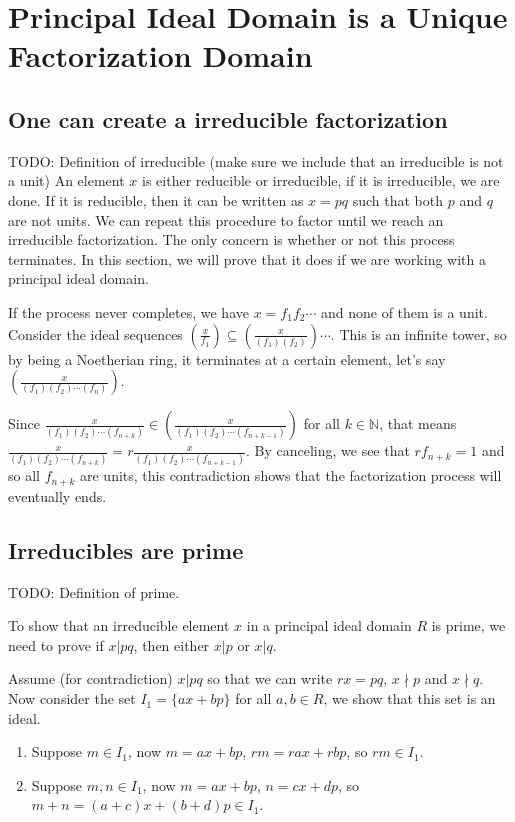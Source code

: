 \documentclass{article}
\begin{document}
\section*{Principal Ideal Domain is a Unique Factorization Domain}
\subsection*{One can create a irreducible factorization}
TODO: Definition of irreducible (make sure we include that an irreducible is not a unit)
An element $ x $ is either reducible or irreducible, if it is irreducible, we are done. If it is reducible, then it can be written as $ x = pq $ such that both $ p $ and $ q $ are not units. We can repeat this procedure to factor until we reach an irreducible factorization. The only concern is whether or not this process terminates. In this section, we will prove that it does if we are working with a principal ideal domain.

If the process never completes, we have $ x = f_1 f_2 \cdots $ and none of them is a unit. Consider the ideal sequences $ \left(\frac{x}{f_1}\right) \subseteq \left(\frac{x}{(f_1)(f_2)}\right) \cdots $. This is an infinite tower, so by being a Noetherian ring, it terminates at a certain element, let's say $ \left(\frac{x}{(f_1)(f_2)\cdots(f_n)}\right) $. 

Since $ \frac{x}{(f_1)(f_2)\cdots(f_{n+k})} \in \left(\frac{x}{(f_1)(f_2)\cdots(f_{n+k-1})}\right) $ for all $ k \in \mathbb{N}$, that means $ \frac{x}{(f_1)(f_2)\cdots(f_{n+k})} = r \frac{x}{(f_1)(f_2)\cdots(f_{n+k-1})} $. By canceling, we see that $ r f_{n+k} = 1 $ and so all $ f_{n+k} $ are units, this contradiction shows that the factorization process will eventually ends.

\subsection*{Irreducibles are prime}
TODO: Definition of prime.

To show that an irreducible element $ x $ in a principal ideal domain $ R $ is prime, we need to prove if $ x | pq $, then either $ x | p $ or $ x | q $.

Assume (for contradiction) $ x | pq $ so that we can write $ rx = pq $, $ x \nmid p $ and $ x \nmid q $. Now consider the set $ I_1 = \{ax + bp\} $ for all $ a, b \in R $, we show that this set is an ideal.

\begin{enumerate}
    \item{Suppose $ m \in I_1 $, now $ m = ax + bp $, $ rm = rax + rbp $, so $ rm \in I_1 $.}
    \item{Suppose $ m, n \in I_1 $, now $ m = ax + bp $, $ n = cx + dp $, so $ m + n = (a+c)x + (b+d)p \in I_1 $.}
\end{enumerate}
\end{document}
